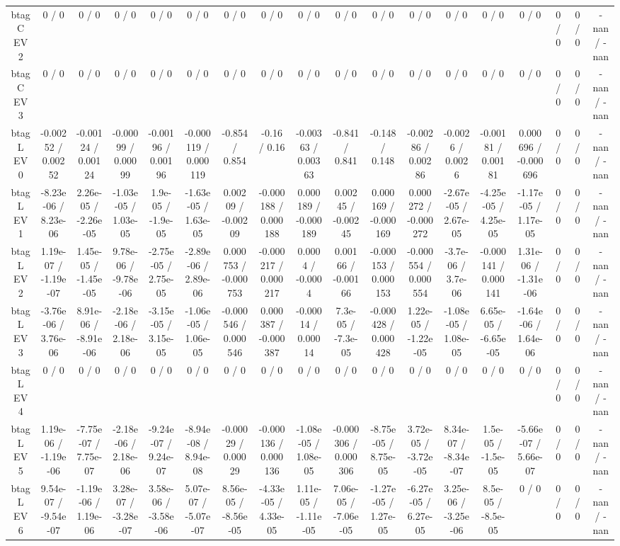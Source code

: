 \documentclass[10pt]{article}
\begin{document}
\begin{table}[htbp]
\begin{center}
\begin{tabular}{|c|c|c|c|c|c|c|c|c|c|c|c|c|c|c|c|c|c|}
  btag C EV 2 & 0 / 0 & 0 / 0 & 0 / 0 & 0 / 0 & 0 / 0 & 0 / 0 & 0 / 0 & 0 / 0 & 0 / 0 & 0 / 0 & 0 / 0 & 0 / 0 & 0 / 0 & 0 / 0 & 0 / 0 & 0 / 0 & -nan / -nan \\ 
  btag C EV 3 & 0 / 0 & 0 / 0 & 0 / 0 & 0 / 0 & 0 / 0 & 0 / 0 & 0 / 0 & 0 / 0 & 0 / 0 & 0 / 0 & 0 / 0 & 0 / 0 & 0 / 0 & 0 / 0 & 0 / 0 & 0 / 0 & -nan / -nan \\ 
  btag L EV 0 & -0.00252 / 0.00252 & -0.00124 / 0.00124 & -0.00099 / 0.00099 & -0.00196 / 0.00196 & -0.000119 / 0.000119 & -0.854 / 0.854 & -0.16 / 0.16 & -0.00363 / 0.00363 & -0.841 / 0.841 & -0.148 / 0.148 & -0.00286 / 0.00286 & -0.0026 / 0.0026 & -0.00181 / 0.00181 & 0.000696 / -0.000696 & 0 / 0 & 0 / 0 & -nan / -nan \\ 
  btag L EV 1 & -8.23e-06 / 8.23e-06 & 2.26e-05 / -2.26e-05 & -1.03e-05 / 1.03e-05 & 1.9e-05 / -1.9e-05 & -1.63e-05 / 1.63e-05 & 0.00209 / -0.00209 & -0.000188 / 0.000188 & 0.000189 / -0.000189 & 0.00245 / -0.00245 & 0.000169 / -0.000169 & 0.000272 / -0.000272 & -2.67e-05 / 2.67e-05 & -4.25e-05 / 4.25e-05 & -1.17e-05 / 1.17e-05 & 0 / 0 & 0 / 0 & -nan / -nan \\ 
  btag L EV 2 & 1.19e-07 / -1.19e-07 & 1.45e-05 / -1.45e-05 & 9.78e-06 / -9.78e-06 & -2.75e-05 / 2.75e-05 & -2.89e-06 / 2.89e-06 & 0.000753 / -0.000753 & -0.000217 / 0.000217 & 0.0004 / -0.0004 & 0.00166 / -0.00166 & -0.000153 / 0.000153 & -0.000554 / 0.000554 & -3.7e-06 / 3.7e-06 & -0.000141 / 0.000141 & 1.31e-06 / -1.31e-06 & 0 / 0 & 0 / 0 & -nan / -nan \\ 
  btag L EV 3 & -3.76e-06 / 3.76e-06 & 8.91e-06 / -8.91e-06 & -2.18e-06 / 2.18e-06 & -3.15e-05 / 3.15e-05 & -1.06e-05 / 1.06e-05 & -0.000546 / 0.000546 & 0.000387 / -0.000387 & -0.00014 / 0.00014 & 7.3e-05 / -7.3e-05 & -0.000428 / 0.000428 & 1.22e-05 / -1.22e-05 & -1.08e-05 / 1.08e-05 & 6.65e-05 / -6.65e-05 & -1.64e-06 / 1.64e-06 & 0 / 0 & 0 / 0 & -nan / -nan \\ 
  btag L EV 4 & 0 / 0 & 0 / 0 & 0 / 0 & 0 / 0 & 0 / 0 & 0 / 0 & 0 / 0 & 0 / 0 & 0 / 0 & 0 / 0 & 0 / 0 & 0 / 0 & 0 / 0 & 0 / 0 & 0 / 0 & 0 / 0 & -nan / -nan \\ 
  btag L EV 5 & 1.19e-06 / -1.19e-06 & -7.75e-07 / 7.75e-07 & -2.18e-06 / 2.18e-06 & -9.24e-07 / 9.24e-07 & -8.94e-08 / 8.94e-08 & -0.00029 / 0.00029 & -0.000136 / 0.000136 & -1.08e-05 / 1.08e-05 & -0.000306 / 0.000306 & -8.75e-05 / 8.75e-05 & 3.72e-05 / -3.72e-05 & 8.34e-07 / -8.34e-07 & 1.5e-05 / -1.5e-05 & -5.66e-07 / 5.66e-07 & 0 / 0 & 0 / 0 & -nan / -nan \\ 
  btag L EV 6 & 9.54e-07 / -9.54e-07 & -1.19e-06 / 1.19e-06 & 3.28e-07 / -3.28e-07 & 3.58e-06 / -3.58e-06 & 5.07e-07 / -5.07e-07 & 8.56e-05 / -8.56e-05 & -4.33e-05 / 4.33e-05 & 1.11e-05 / -1.11e-05 & 7.06e-05 / -7.06e-05 & -1.27e-05 / 1.27e-05 & -6.27e-05 / 6.27e-05 & 3.25e-06 / -3.25e-06 & 8.5e-05 / -8.5e-05 & 0 / 0 & 0 / 0 & 0 / 0 & -nan / -nan \\ 

\end{tabular}
\end{center}
\end{table}
\end{document}

